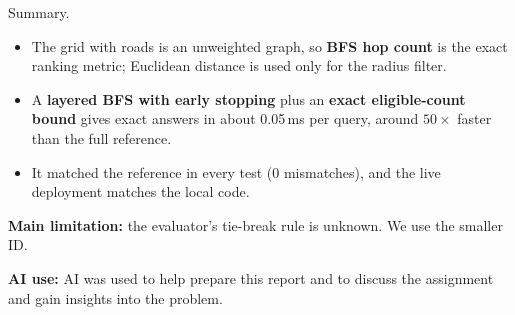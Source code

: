 \documentclass[11pt,a4paper]{article}
\begin{document}
\begin{keybox}{Summary.}
\begin{itemize}
  \item The grid with roads is an unweighted graph, so \textbf{BFS hop count} is the exact ranking metric;
        Euclidean distance is used only for the radius filter.
  \item A \textbf{layered BFS with early stopping} plus an \textbf{exact eligible-count bound} gives exact
        answers in about 0.05\,ms per query, around $50\times$ faster than the full reference.
  \item It matched the reference in every test (0 mismatches), and the live deployment matches the local code.
\end{itemize}
\end{keybox}

\textbf{Main limitation:} the evaluator's tie-break rule is unknown. We use the smaller ID.

\vspace{0.8em}
{\small\color{muted}\textbf{AI use:} AI was used to help prepare this report and to discuss the assignment and gain insights into the problem.}
\end{document}
